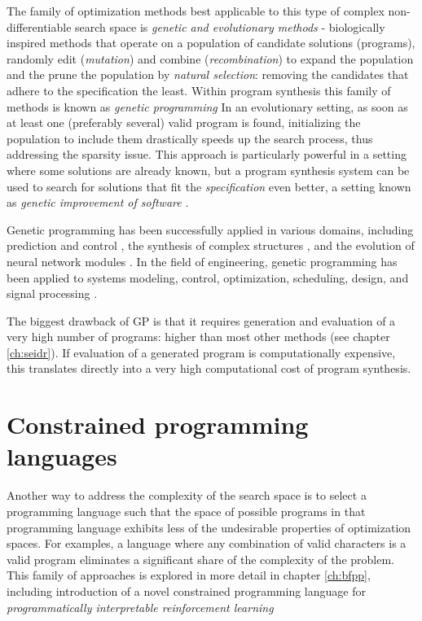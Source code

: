 The family of optimization methods best applicable to this type of complex non-differentiable search space is \emph{genetic and evolutionary methods} - biologically inspired methods that operate on a population of candidate solutions (programs), randomly edit (\emph{mutation}) and combine (\emph{recombination}) to expand the population and the prune the population by \emph{natural selection}: removing the candidates that adhere to the specification the least.
Within program synthesis this family of methods is known as \emph{genetic programming} \cite{genprog1, genprog2, genprogast}
In an evolutionary setting, as soon as at least one (preferably several) valid program is found, initializing the population to include them drastically speeds up the search process, thus addressing the sparsity issue.
This approach is particularly powerful in a setting where some solutions are already known, but a program synthesis system can be used to search for solutions that fit the \emph{specification} even better, a setting known as \emph{genetic improvement of software} \cite{petke2018:genetic}.

Genetic programming has been successfully applied in various domains, including prediction and control \cite{dracopoulosGeneticProgrammingPrediction1997}, the synthesis of complex structures \cite{kozaHumancompetitiveApplicationsGenetic2003}, and the evolution of neural network modules \cite{degarisGENETICPROGRAMMING1990}. In the field of engineering, genetic programming has been applied to systems modeling, control, optimization, scheduling, design, and signal processing \cite{willisGeneticProgrammingIntroduction1997}. 

The biggest drawback of GP is that it requires generation and evaluation of a very high number of programs: higher than most other methods (see chapter \ref{ch:seidr}).
If evaluation of a generated program is computationally expensive, this translates directly into a very high computational cost of program synthesis.

\newpage
\section{Constrained programming languages}
\label{sec:constrainedpl}

Another way to address the complexity of the search space is to select a programming language such that the space of possible programs in that programming language exhibits less of the undesirable properties of optimization spaces.
For examples, a language where any combination of valid characters is a valid program \cite{brainfuck} eliminates a significant share of the complexity of the problem.
This family of approaches is explored in more detail in chapter \ref{ch:bfpp}, including  introduction of a novel constrained programming language for \emph{programmatically interpretable reinforcement learning}

